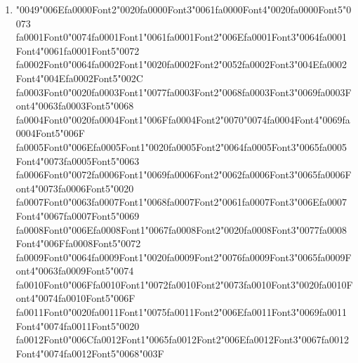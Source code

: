 \documentclass[11pt]{article}
\begin{document}
\begin{enumerate}[label=Q\arabic*., leftmargin=*]
\item {\char"0049}{\char"006E}{\csname fa0000Font2\endcsname\char"0020}{\csname fa0000Font3\endcsname\char"0061}{\csname fa0000Font4\endcsname\char"0020}{\csname fa0000Font5\endcsname\char"0073} {\csname fa0001Font0\endcsname\char"0074}{\csname fa0001Font1\endcsname\char"0061}{\csname fa0001Font2\endcsname\char"006E}{\csname fa0001Font3\endcsname\char"0064}{\csname fa0001Font4\endcsname\char"0061}{\csname fa0001Font5\endcsname\char"0072} {\csname fa0002Font0\endcsname\char"0064}{\csname fa0002Font1\endcsname\char"0020}{\csname fa0002Font2\endcsname\char"0052}{\csname fa0002Font3\endcsname\char"004E}{\csname fa0002Font4\endcsname\char"004E}{\csname fa0002Font5\endcsname\char"002C} {\csname fa0003Font0\endcsname\char"0020}{\csname fa0003Font1\endcsname\char"0077}{\csname fa0003Font2\endcsname\char"0068}{\csname fa0003Font3\endcsname\char"0069}{\csname fa0003Font4\endcsname\char"0063}{\csname fa0003Font5\endcsname\char"0068} {\csname fa0004Font0\endcsname\char"0020}{\csname fa0004Font1\endcsname\char"006F}{\csname fa0004Font2\endcsname\char"0070}{\char"0074}{\csname fa0004Font4\endcsname\char"0069}{\csname fa0004Font5\endcsname\char"006F} {\csname fa0005Font0\endcsname\char"006E}{\csname fa0005Font1\endcsname\char"0020}{\csname fa0005Font2\endcsname\char"0064}{\csname fa0005Font3\endcsname\char"0065}{\csname fa0005Font4\endcsname\char"0073}{\csname fa0005Font5\endcsname\char"0063} {\csname fa0006Font0\endcsname\char"0072}{\csname fa0006Font1\endcsname\char"0069}{\csname fa0006Font2\endcsname\char"0062}{\csname fa0006Font3\endcsname\char"0065}{\csname fa0006Font4\endcsname\char"0073}{\csname fa0006Font5\endcsname\char"0020} {\csname fa0007Font0\endcsname\char"0063}{\csname fa0007Font1\endcsname\char"0068}{\csname fa0007Font2\endcsname\char"0061}{\csname fa0007Font3\endcsname\char"006E}{\csname fa0007Font4\endcsname\char"0067}{\csname fa0007Font5\endcsname\char"0069} {\csname fa0008Font0\endcsname\char"006E}{\csname fa0008Font1\endcsname\char"0067}{\csname fa0008Font2\endcsname\char"0020}{\csname fa0008Font3\endcsname\char"0077}{\csname fa0008Font4\endcsname\char"006F}{\csname fa0008Font5\endcsname\char"0072} {\csname fa0009Font0\endcsname\char"0064}{\csname fa0009Font1\endcsname\char"0020}{\csname fa0009Font2\endcsname\char"0076}{\csname fa0009Font3\endcsname\char"0065}{\csname fa0009Font4\endcsname\char"0063}{\csname fa0009Font5\endcsname\char"0074} {\csname fa0010Font0\endcsname\char"006F}{\csname fa0010Font1\endcsname\char"0072}{\csname fa0010Font2\endcsname\char"0073}{\csname fa0010Font3\endcsname\char"0020}{\csname fa0010Font4\endcsname\char"0074}{\csname fa0010Font5\endcsname\char"006F} {\csname fa0011Font0\endcsname\char"0020}{\csname fa0011Font1\endcsname\char"0075}{\csname fa0011Font2\endcsname\char"006E}{\csname fa0011Font3\endcsname\char"0069}{\csname fa0011Font4\endcsname\char"0074}{\csname fa0011Font5\endcsname\char"0020} {\csname fa0012Font0\endcsname\char"006C}{\csname fa0012Font1\endcsname\char"0065}{\csname fa0012Font2\endcsname\char"006E}{\csname fa0012Font3\endcsname\char"0067}{\csname fa0012Font4\endcsname\char"0074}{\csname fa0012Font5\endcsname\char"0068}{\char"003F}


\end{enumerate}
\end{document}
